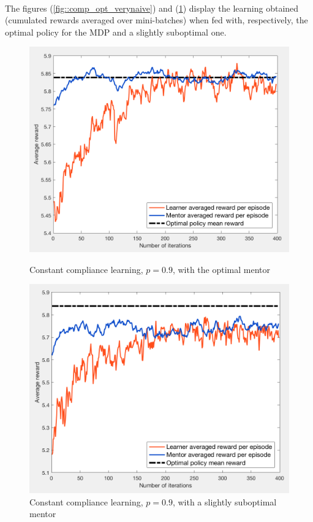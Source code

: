\documentclass[a4paper]{report}
\begin{document}
{{{			\paragraph{} The figures (\ref{fig::comp_opt_verynaive}) and (\ref{fig::comp_subopt220_verynaive}) display the learning obtained (cumulated rewards averaged over mini-batches) when fed with, respectively, the optimal policy for the MDP and a slightly suboptimal one. 
			
			\begin{figure}[h!]
				\begin{minipage}{0.5\linewidth}
					\begin{center}
						\includegraphics[width=0.9\linewidth]{very_naive_opt}
						\caption{Constant compliance learning, $p=0.9$, with the optimal mentor}
						\label{fig::comp_opt_verynaive}
					\end{center}
				\end{minipage}
				\begin{minipage}{0.5\linewidth}
					\begin{center}
						\includegraphics[width=0.9\linewidth]{very_naive_200}
						\caption{Constant compliance learning, $p=0.9$, with a slightly suboptimal mentor}
						\label{fig::comp_subopt220_verynaive}
					\end{center}
				\end{minipage}
			\end{figure}
	
}}}
\end{document}
